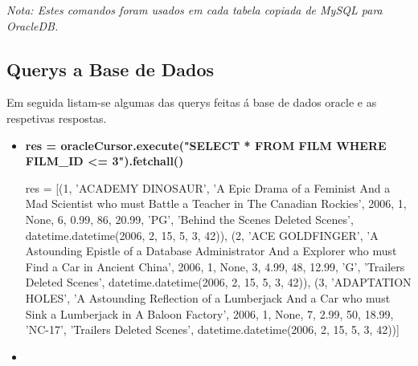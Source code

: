 \textit{Nota: Estes comandos foram usados em cada tabela copiada de MySQL para OracleDB.}

\subsection{Querys a Base de Dados}

Em seguida listam-se algumas das querys feitas á base de dados oracle e as respetivas respostas.

\begin{itemize}
\item \textbf{res = oracleCursor.execute("SELECT * FROM FILM WHERE FILM\_ID <= 3").fetchall()}

res = [(1, 'ACADEMY DINOSAUR', 'A Epic Drama of a Feminist And a Mad Scientist who must Battle a Teacher in The Canadian Rockies', 2006, 1, None, 6, 0.99, 86, 20.99, 'PG', 'Behind the Scenes Deleted Scenes', datetime.datetime(2006, 2, 15, 5, 3, 42)), (2, 'ACE GOLDFINGER', 'A Astounding Epistle of a Database Administrator And a Explorer who must Find a Car in Ancient China', 2006, 1, None, 3, 4.99, 48, 12.99, 'G', 'Trailers Deleted Scenes', datetime.datetime(2006, 2, 15, 5, 3, 42)), (3, 'ADAPTATION HOLES', 'A Astounding Reflection of a Lumberjack And a Car who must Sink a Lumberjack in A Baloon Factory', 2006, 1, None, 7, 2.99, 50, 18.99, 'NC-17', 'Trailers Deleted Scenes', datetime.datetime(2006, 2, 15, 5, 3, 42))]
\item
\end{itemize}











